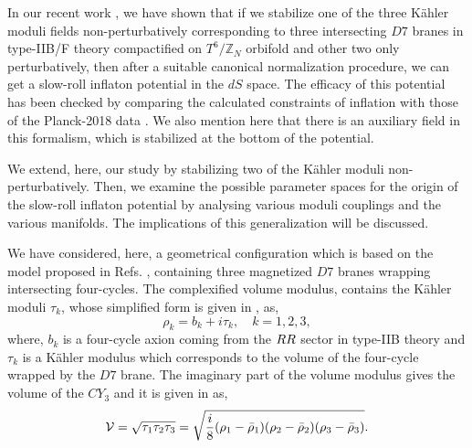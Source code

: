 \documentclass[doublecol]{epl2}
\begin{document}
 In our recent work \cite{Let:2022fmu}, we have shown that if we stabilize one of the three K\"{a}hler moduli fields non-perturbatively corresponding to three intersecting $D7$ branes in type-IIB/F theory compactified on $T^6/\mathbb{Z}_N$ orbifold and other two only perturbatively, then after a suitable canonical normalization procedure, we can get a slow-roll inflaton potential in the $dS$ space. The efficacy of this potential has been checked \cite{Let:2022fmu} by comparing the calculated constraints of inflation with those of the Planck-2018 data \cite{Planck:2018jri,Planck:2018vyg}. We also mention here that there is an auxiliary field in this formalism, which is stabilized at the bottom of the potential.
 \par 
  We extend, here, our study by stabilizing two of the K\"{a}hler moduli non-perturbatively. Then, we examine the possible parameter spaces for the origin of the slow-roll inflaton potential by analysing various moduli couplings and the various manifolds. The implications of this generalization will be discussed.\par
  We have considered, here, a geometrical configuration which is based on the model proposed in Refs. \cite{Antoniadis:2018hqy,Basiouris:2020jgp,Antoniadis:2018ngr}, containing three magnetized  $D7$ branes wrapping intersecting four-cycles. The complexified volume modulus, contains the K\"ahler moduli $\tau_k$, whose simplified form is given in \cite{Giddings:2001yu}, as,
   \begin{equation}
       \rho_k = b_k +i \tau_k, \quad k=1,2,3, 
       \label{rho}
   \end{equation} where,
   $b_k$ is a four-cycle axion coming from the $\boldmath RR$ sector in type-IIB theory and $\tau_k$ is a K\"ahler modulus which corresponds to the volume of the four-cycle wrapped by the $D7$ brane. The imaginary part of the volume modulus gives the volume of the $CY_3$ and it is given in \cite{Let:2022fmu,Basiouris:2021sdf} as,
 \begin{equation}
     \mathcal{V} = \sqrt{\tau_1 \tau_2 \tau_3} =\sqrt{\frac{i}{8}(\rho_1 -\Bar{\rho}_1)(\rho_2-\Bar{\rho}_2)(\rho_3-\Bar{\rho}_3)} .
     \label{Eq:2.1}
 \end{equation}
\end{document}
